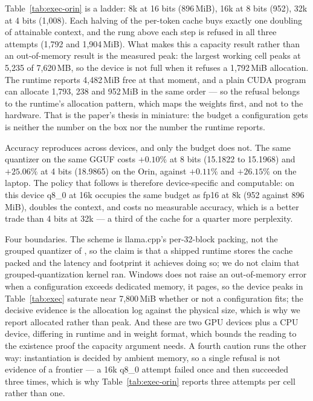 \documentclass[10pt,journal]{IEEEtran}
\begin{document}
Table~\ref{tab:exec-orin} is a ladder: 8k at 16 bits (896\,MiB), 16k at 8 bits
(952), 32k at 4 bits (1{,}008). Each halving of the per-token cache buys exactly one
doubling of attainable context, and the rung above each step is refused in all three
attempts (1{,}792 and 1{,}904\,MiB). What makes this a capacity result rather than
an out-of-memory result is the measured peak: the largest working cell peaks at
5{,}235 of 7{,}620\,MB, so the device is not full when it refuses a 1{,}792\,MiB
allocation. The runtime reports 4{,}482\,MiB free at that moment, and a plain CUDA
program can allocate 1{,}793, 238 and 952\,MiB in the same order --- so the refusal
belongs to the runtime's allocation pattern, which maps the weights first, and not
to the hardware. That is the paper's thesis in miniature: the budget a configuration
gets is neither the number on the box nor the number the runtime reports.

Accuracy reproduces across devices, and only the budget does not. The same quantizer
on the same GGUF costs $+0.10\%$ at 8 bits (15.1822 to 15.1968) and $+25.06\%$ at 4
bits (18.9865) on the Orin, against $+0.11\%$ and $+26.15\%$ on the laptop. The policy
that follows is therefore device-specific and computable: on this device q8\_0 at 16k
occupies the same budget as fp16 at 8k (952 against 896\,MiB), doubles the context,
and costs no measurable accuracy, which is a better trade than 4 bits at 32k --- a
third of the cache for a quarter more perplexity.

Four boundaries. The scheme is llama.cpp's per-32-block packing, not the grouped
quantizer of \cite{kivi}, so the claim is that a shipped runtime stores the cache
packed and the latency and footprint it achieves doing so; we do not claim that
grouped-quantization kernel ran. Windows does not raise an out-of-memory error when
a configuration exceeds dedicated memory, it pages, so the device peaks in
Table~\ref{tab:exec} saturate near 7{,}800\,MiB whether or not a configuration
fits; the decisive evidence is the allocation log against the physical size, which
is why we report allocated rather than peak. And these are two GPU devices plus a CPU device, differing in runtime
and in weight format, which bounds the reading to the existence proof the capacity
argument needs. A fourth caution runs the other way: instantiation is decided by
ambient memory, so a single refusal is not evidence of a frontier --- a 16k q8\_0 attempt
failed once and then succeeded three times, which is why Table~\ref{tab:exec-orin} reports
three attempts per cell rather than one.
\end{document}
